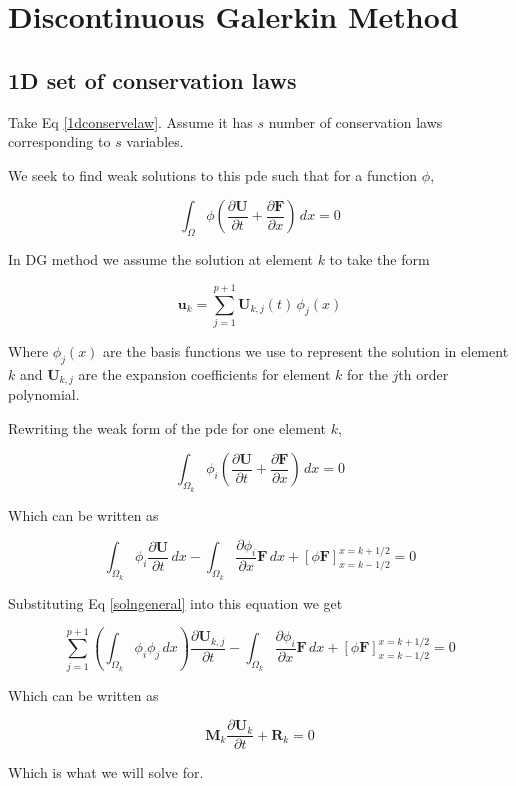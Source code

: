 \documentclass{article}
\begin{document}
\section{Discontinuous Galerkin Method}
\subsection{1D set of conservation laws}

Take Eq \ref{1dconservelaw}. Assume it has $s$ number of conservation laws corresponding to $s$ variables. 

We seek to find weak solutions to this pde such that for a function $\phi$,

\begin{equation}
    \int_\Omega \phi \left( \frac{\partial \mathbf{U}}{\partial t} + \frac{\partial \mathbf{F}}{\partial x} \right) \,dx = 0
\end{equation}

In DG method we assume the solution at element $k$ to take the form

\begin{equation}
    \mathbf{u}_k = \sum_{j=1}^{p+1} \mathbf{U}_{k,j}(t)\, \phi_j(x)
    \label{solngeneral}
\end{equation}

Where $\phi_j(x)$ are the basis functions we use to represent the solution in element $k$ and $\mathbf{U}_{k,j}$ are the expansion coefficients for element $k$ for the $j$th order
polynomial.

Rewriting the weak form of the pde for one element $k$,

\begin{equation}
    \int_{\Omega_k} \phi_i \left( \frac{\partial \mathbf{U}}{\partial t} + \frac{\partial \mathbf{F}}{\partial x} \right) \,dx = 0
\end{equation}

Which can be written as 

\begin{equation}
    \int_{\Omega_k} \phi_i  \frac{\partial \mathbf{U}}{\partial t}  \,dx - \int_{\Omega_k} \frac{\partial \phi_i}{\partial x} \mathbf{F} \,dx + \left[ \phi \mathbf{F}\right]_{x=k-1/2}^{x=k+1/2} = 0
\end{equation}

Substituting Eq \ref{solngeneral} into this equation we get

\begin{equation}
     \sum_{j=1}^{p+1} \left(\int_{\Omega_k} \phi_i  \phi_j  \,dx\right) \frac{\partial \mathbf{U}_{k,j}}{\partial t} - \int_{\Omega_k} \frac{\partial \phi_i}{\partial x} \mathbf{F} \,dx + \left[ \phi \mathbf{F}\right]_{x=k-1/2}^{x=k+1/2} = 0 
\end{equation}

Which can be written as 

\begin{equation}
    \mathbf{M}_k\frac{\partial \mathbf{U}_k}{\partial t} + \mathbf{R}_k = 0
\end{equation}

Which is what we will solve for.
\end{document}
